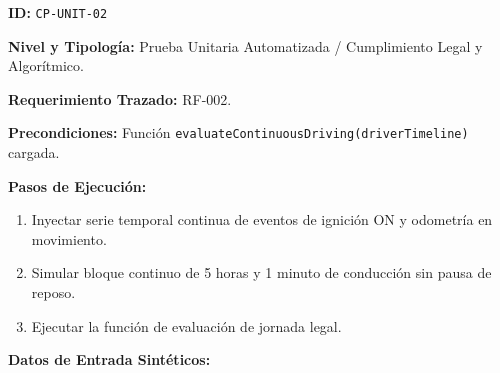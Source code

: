 \par\noindent\textbf{ID:} \texttt{C\allowbreak{}P\allowbreak{}-\allowbreak{}U\allowbreak{}N\allowbreak{}I\allowbreak{}T\allowbreak{}-\allowbreak{}0\allowbreak{}2\allowbreak{}}\par
\par\noindent\textbf{Nivel y Tipología:} Prueba Unitaria Automatizada / Cumplimiento Legal y Algorítmico.\par
\par\noindent\textbf{Requerimiento Trazado:} RF-002.\par
\par\noindent\textbf{Precondiciones:} Función \texttt{e\allowbreak{}v\allowbreak{}a\allowbreak{}l\allowbreak{}u\allowbreak{}a\allowbreak{}t\allowbreak{}e\allowbreak{}C\allowbreak{}o\allowbreak{}n\allowbreak{}t\allowbreak{}i\allowbreak{}n\allowbreak{}u\allowbreak{}o\allowbreak{}u\allowbreak{}s\allowbreak{}D\allowbreak{}r\allowbreak{}i\allowbreak{}v\allowbreak{}i\allowbreak{}n\allowbreak{}g\allowbreak{}(\allowbreak{}d\allowbreak{}r\allowbreak{}i\allowbreak{}v\allowbreak{}e\allowbreak{}r\allowbreak{}T\allowbreak{}i\allowbreak{}m\allowbreak{}e\allowbreak{}l\allowbreak{}i\allowbreak{}n\allowbreak{}e\allowbreak{})\allowbreak{}} cargada.\par
\par\noindent\textbf{Pasos de Ejecución:} \par
\begin{enumerate}
\item Inyectar serie temporal continua de eventos de ignición ON y odometría en movimiento.
\item Simular bloque continuo de 5 horas y 1 minuto de conducción sin pausa de reposo.
\item Ejecutar la función de evaluación de jornada legal.
\end{enumerate}
\par\noindent\textbf{Datos de Entrada Sintéticos:} \par
